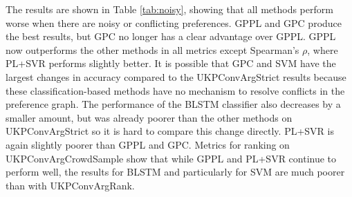 The results are shown in Table \ref{tab:noisy}, showing that all methods perform worse
when there are noisy or conflicting preferences. 
GPPL and GPC produce the best results, but GPC no longer has a clear advantage over GPPL. 
GPPL now outperforms the other methods in all metrics except Spearman's $\rho$, where PL+SVR performs slightly better. 
It is possible that GPC and SVM have the
largest changes in accuracy compared to the UKPConvArgStrict results because these classification-based methods
have no mechanism to resolve conflicts in the preference graph. The performance of the BLSTM classifier also 
decreases by a smaller amount, but was already poorer than the other methods on UKPConvArgStrict so it is hard to 
compare this change directly. PL+SVR is again slightly poorer than GPPL and GPC.
Metrics for ranking on UKPConvArgCrowdSample show that while GPPL and PL+SVR continue to perform well, the 
results for BLSTM and particularly for SVM are much poorer than with UKPConvArgRank. 


